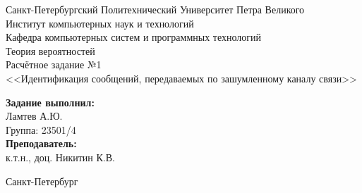 \begin{titlepage}	%

	\begin{center}		%

		\large Санкт-Петербургский Политехнический Университет Петра Великого\\
		\large Институт компьютерных наук и технологий \\
		\large Кафедра компьютерных систем и программных технологий\\[6cm]
		
		\huge Теория вероятностей \\[0.5cm]
		\large Расчётное задание №1\\[0.1cm]
		\large <<Идентификация сообщений, передаваемых по зашумленному каналу связи>>\\[6cm]

	\end{center}


	\begin{flushright}
		\begin{minipage}{0.33\textwidth} 
			\begin{flushleft} 

				\large\textbf{Задание выполнил:}\\
				\large Ламтев А.Ю.\\
				\large {Группа:} 23501/4\\
				
				\large \textbf{Преподаватель:}\\
				\large к.т.н., доц. Никитин К.В.

			\end{flushleft}
		\end{minipage}
	\end{flushright}
	
	\vfill 

	\begin{center}
	\large Санкт-Петербург\\
	\large \the\year
	\end{center}

\thispagestyle{empty}
\end{titlepage}

\vfill
